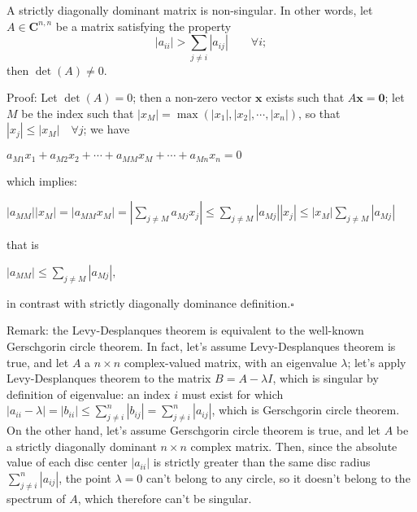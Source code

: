 \documentclass[12pt]{article}
\begin{document}
A strictly diagonally dominant matrix is non-singular. In other words, let $A\in\mathbf{C}^{n,n}$ be a matrix satisfying the property
\[
\left|a_{ii}\right|>\sum_{j\ne i}\left|a_{ij}\right|\qquad \forall i;
\]
then $\det(A)\ne 0$.

Proof:
Let $\det(A)=0$; then a non-zero vector $\mathbf{x}$ exists such that $A\mathbf{x}=\mathbf{0}$; let $M$ be the index such that $\left|x_M\right|=\max(\left|x_1\right|,\left|x_2\right|,\cdots,\left|x_n\right|)$, so that $\left|x_j\right|\leq\left|x_M\right|\quad \forall j$; we have

$a_{M1}x_1+a_{M2}x_2+\cdots+a_{MM}x_M+\cdots+a_{Mn}x_n=0$

which implies:

$\left|a_{MM}\right|\left|x_M\right|=\left|a_{MM}x_M\right|=\left|\sum_{j\ne M}a_{Mj}x_j\right|\leq\sum_{j\ne M}\left|a_{Mj}\right|\left|x_j\right|\leq\left|x_M\right|\sum_{j\ne M}\left|a_{Mj}\right|$

that is

$\left|a_{MM}\right|\leq\sum_{j\ne M}\left|a_{Mj}\right|,$

in contrast with strictly diagonally dominance definition.$\square$


Remark:
the Levy-Desplanques theorem is equivalent to the well-known Gerschgorin circle theorem. In fact, let's assume Levy-Desplanques theorem is true, and let $A$ a $n\times n$ complex-valued matrix, with an eigenvalue $\lambda$; let's apply Levy-Desplanques theorem to the matrix $B=A-\lambda I$, which is singular by definition of eigenvalue: an index $i$ must exist for which $\left|a_{ii}-\lambda\right|=\left|b_{ii}\right|\leq\sum_{j\ne i}^n \left|b_{ij}\right|=\sum_{j\ne i}^n \left|a_{ij}\right|$, which is Gerschgorin circle theorem.
On the other hand, let's assume Gerschgorin circle theorem is true, and let $A$ be a strictly diagonally dominant $n\times n$ complex matrix. Then, since the absolute value of each disc center $\left|a_{ii}\right|$ is strictly greater than the same disc radius $\sum_{j\ne i}^n \left|a_{ij}\right|$, the point $\lambda=0$ can't belong to any circle, so it doesn't belong to the spectrum of $A$, which therefore can't be singular.
\end{document}
